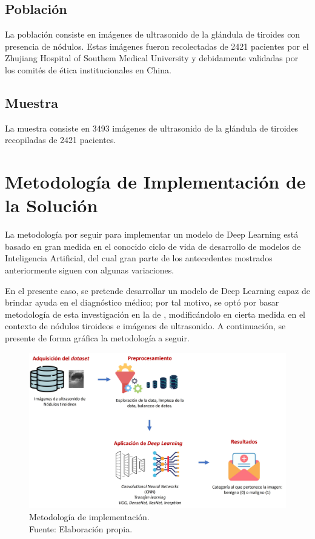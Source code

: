 \subsection{Población}
La población consiste en imágenes de ultrasonido de la glándula de tiroides con presencia de nódulos. Estas imágenes fueron recolectadas de 2421 pacientes por el Zhujiang Hospital of Southem Medical University y debidamente validadas por los comités de ética institucionales en China.

\subsection{Muestra}
La muestra consiste en 3493 imágenes de ultrasonido de la glándula de tiroides recopiladas de 2421 pacientes.

\section{Metodología de Implementación de la Solución}
La metodología por seguir para implementar un modelo de Deep Learning está basado en gran medida en el conocido ciclo de vida de desarrollo de modelos de Inteligencia Artificial, del cual gran parte de los antecedentes mostrados anteriormente siguen con algunas variaciones. 

En el presente caso, se pretende desarrollar un modelo de Deep Learning capaz de brindar ayuda en el diagnóstico médico; por tal motivo, se optó por basar metodología de esta investigación en la de \cite{pr_monroy2021disvc}, modificándolo en cierta medida en el contexto de nódulos tiroideos e imágenes de ultrasonido. A continuación, se presente de forma gráfica la metodología a seguir.

\begin{figure}[H]
	\begin{center}
		\includegraphics[width=1.00\textwidth]{3/figures/metod_classthy1.jpg}
		\caption[Metodología de implementación]{Metodología de implementación. \\
		Fuente: Elaboración propia.}
		\label{3:fig301}
	\end{center}
\end{figure}

